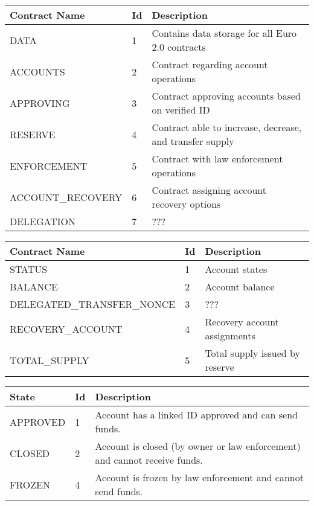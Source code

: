 \documentclass[12pt]{article} %
\begin{document}
{{\begin{center}
\begin{tabular}{ | l | l | p{10cm} | }
 \hline
 Contract Name & Id & Description
 \\ \hline\hline
 DATA & 1 & Contains data storage for all Euro 2.0 contracts
 \\ \hline
 ACCOUNTS & 2 & Contract regarding account operations
 \\ \hline
 APPROVING & 3 & Contract approving accounts based on verified ID
 \\ \hline
 RESERVE & 4 & Contract able to increase, decrease, and transfer supply
 \\ \hline
 ENFORCEMENT & 5 & Contract with law enforcement operations
 \\ \hline
 ACCOUNT\_RECOVERY & 6 & Contract assigning account recovery options
 \\ \hline
 DELEGATION & 7 & ???
 \\ \hline
\end{tabular}
\end{center}
\label{tab:constantSubcontractIds}

\begin{center}
\begin{tabular}{ | l | l | p{10cm} | }
 \hline
 Contract Name & Id & Description
 \\ \hline\hline
 STATUS & 1 & Account states
 \\ \hline
 BALANCE & 2 & Account balance
 \\ \hline
 DELEGATED\_TRANSFER\_NONCE & 3 & ???
 \\ \hline
 RECOVERY\_ACCOUNT & 4 & Recovery account assignments
 \\ \hline
 TOTAL\_SUPPLY & 5 & Total supply issued by reserve
 \\ \hline
\end{tabular}
\end{center}
\label{tab:constantBucketIds}

\begin{center}
\begin{tabular}{ | l | l | p{10cm} | }
 \hline
 State & Id & Description
 \\ \hline\hline
 APPROVED & 1 & Account has a linked ID approved and can send funds.
 \\ \hline
 CLOSED & 2 & Account is closed (by owner or law enforcement) and cannot receive funds.
 \\ \hline
 FROZEN & 4 & Account is frozen by law enforcement and cannot send funds.
 \\ \hline
\end{tabular}
\end{center}
\label{tab:constantAccountStates}

}}
\end{document}

